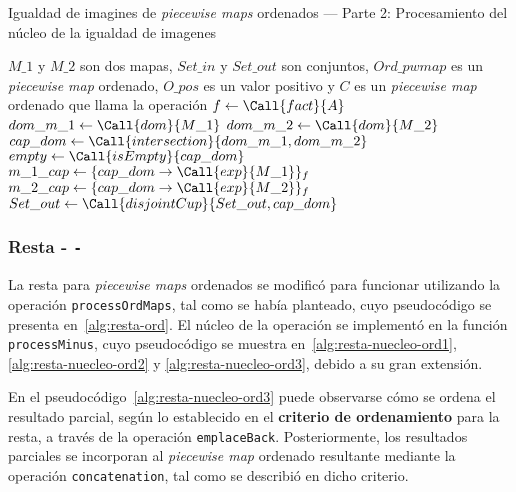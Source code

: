 \begin{algorithm}
\caption{Igualdad de imagines de \textit{piecewise maps} ordenados — Parte 2: Procesamiento del núcleo de la igualdad de imagenes}
\label{alg:equalImage-ord-nucleo}
\begin{algorithmic}[1]
\Require $M\_1$ y $M\_2$ son dos mapas, $Set\_in$ y $Set\_out$ son conjuntos, $Ord\_pwmap$ es un \textit{piecewise map} ordenado, $O\_pos$ es un valor positivo y $C$ es un \textit{piecewise map} ordenado que llama la operación
    \State $f \gets \Call{fact}{A}$
    \State $dom\_m\_1 \gets \Call{dom}{M\_1}$
    \State $dom\_m\_2 \gets \Call{dom}{M\_2}$
    \State $cap\_dom \gets \Call{intersection}{dom\_m\_1, dom\_m\_2}$
    \State $empty \gets \Call{isEmpty}{cap\_dom}$
        \State $m\_1\_cap \gets \{cap\_dom \rightarrow \Call{exp}{M\_1}\}_f$
        \State $m\_2\_cap \gets \{cap\_dom \rightarrow \Call{exp}{M\_2}\}_f$
            \State $Set\_out \gets \Call{disjointCup}{Set\_out, cap\_dom}$
        \EndIf
    \EndIf
    \State \Return
\EndFunction
\end{algorithmic}
\end{algorithm}

\subsubsection{Resta - \texttt{-}}

La resta para \textit{piecewise maps} ordenados se modificó para funcionar utilizando la operación \texttt{processOrdMaps}, tal como se había planteado, cuyo pseudocódigo se presenta en~\ref{alg:resta-ord}.  
El núcleo de la operación se implementó en la función \texttt{processMinus}, cuyo pseudocódigo se muestra en~\ref{alg:resta-nuecleo-ord1}, \ref{alg:resta-nuecleo-ord2} y \ref{alg:resta-nuecleo-ord3}, debido a su gran extensión.


En el pseudocódigo~\ref{alg:resta-nuecleo-ord3} puede observarse cómo se ordena el resultado parcial, según lo establecido en el \textbf{criterio de ordenamiento} para la resta, a través de la operación \texttt{emplaceBack}.  
Posteriormente, los resultados parciales se incorporan al \textit{piecewise map} ordenado resultante mediante la operación \texttt{concatenation}, tal como se describió en dicho criterio.


